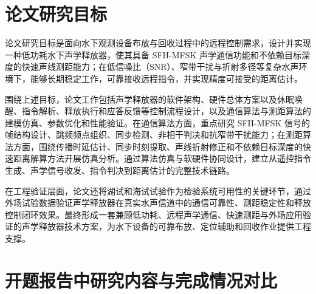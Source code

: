 
\section{论文研究目标}
论文研究目标是面向水下观测设备布放与回收过程中的远程控制需求，设计并实现一种低功耗水下声学释放器，使其具备 SFH-MFSK 声学通信功能和不依赖目标深度的快速声线测距能力；在低信噪比（SNR）、窄带干扰与折射多径等复杂水声环境下，能够长期稳定工作，可靠接收远程指令，并实现精度可接受的距离估计。

围绕上述目标，论文工作包括声学释放器的软件架构、硬件总体方案以及休眠唤醒、指令解析、释放执行和应答反馈等控制流程设计，以及通信算法与测距算法的建模仿真、参数优化和性能验证。在通信算法方面，重点研究 SFH-MFSK 信号的帧结构设计、跳频频点组织、同步检测、非相干判决和抗窄带干扰能力；在测距算法方面，围绕传播时延估计、同步时刻提取、声线折射修正和不依赖目标深度的快速距离解算方法开展仿真分析。通过算法仿真与软硬件协同设计，建立从遥控指令生成、声学信号收发、指令判决到距离估计的完整技术链路。

在工程验证层面，论文还将湖试和海试试验作为检验系统可用性的关键环节，通过外场试验数据验证声学释放器在真实水声信道中的通信可靠性、测距稳定性和释放控制闭环效果。最终形成一套兼顾低功耗、远程声学通信、快速测距与外场应用验证的声学释放器技术方案，为水下设备的可靠布放、定位辅助和回收作业提供工程支撑。
\section{开题报告中研究内容与完成情况对比}

